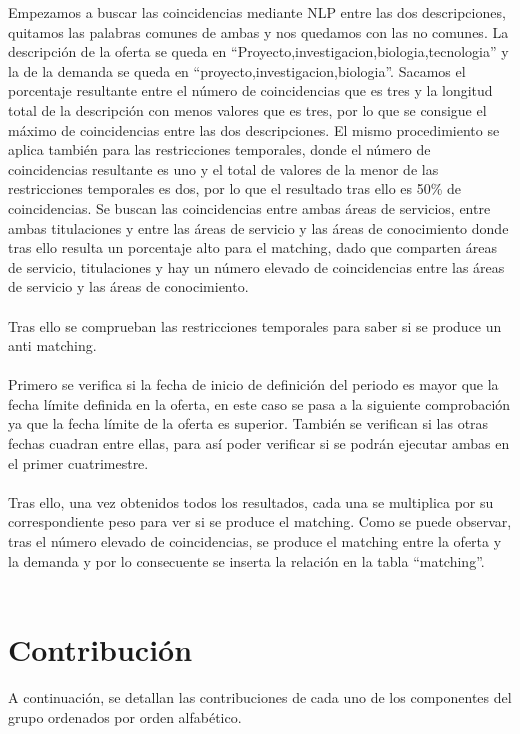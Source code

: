 \documentclass[11pt]{book}
\begin{document}
Empezamos a buscar las coincidencias mediante NLP entre las dos descripciones, quitamos las palabras comunes de ambas y nos quedamos con las no comunes. La descripción de la oferta se queda en “Proyecto,investigacion,biologia,tecnologia” y la de la demanda se queda en “proyecto,investigacion,biologia”. Sacamos el porcentaje resultante entre el número de coincidencias que es tres y la longitud total de la descripción con menos valores que es tres, por lo que se consigue el máximo de coincidencias entre las dos descripciones. El mismo procedimiento se aplica también para las restricciones temporales, donde el número de coincidencias resultante es uno y el total de valores de la menor de las restricciones temporales es dos, por lo que el resultado tras ello es 50\% de coincidencias. Se buscan las coincidencias entre ambas áreas de servicios, entre ambas  titulaciones y entre las áreas de servicio y las áreas de conocimiento donde tras ello resulta un porcentaje alto para el matching, dado que comparten áreas de servicio, titulaciones y hay un número elevado de coincidencias entre las áreas de servicio y las áreas de conocimiento.\\\\
Tras ello se comprueban las restricciones temporales para saber si se produce un anti matching.\\\\
Primero se verifica si la fecha de inicio de definición del periodo es mayor que la fecha límite definida en la oferta, en este caso se pasa a la siguiente comprobación ya que la fecha límite de la oferta es superior. También se verifican si las otras fechas cuadran entre ellas, para así poder verificar si se podrán ejecutar ambas en el primer cuatrimestre. \\\\
Tras ello, una vez obtenidos todos los resultados, cada una se multiplica por su correspondiente peso para ver si se produce el matching. Como se puede observar, tras el número elevado de coincidencias, se produce el matching entre la oferta y la demanda y por lo consecuente se inserta la relación en la tabla “matching”.\\\\

\chapter{Contribución}
A continuación, se detallan las contribuciones de cada uno de los componentes del grupo ordenados por orden alfabético.
\end{document}
